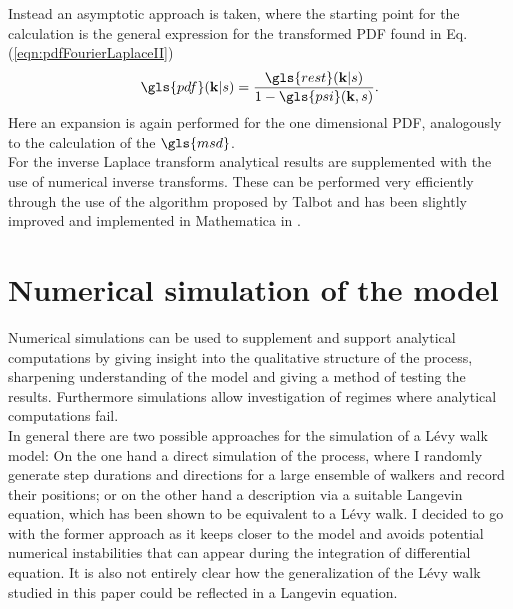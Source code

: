 Instead an asymptotic approach is taken, where the starting point for the calculation is the general expression for the transformed \gls{PDF} found in  Eq. (\ref{eqn:pdfFourierLaplaceII})
%
\begin{align}
\gls{pdf}(\ve{k}|s) = \frac{ \gls{rest}(\ve{k}|s)}{1 - \gls{psi}(\ve{k},s)}  .
\end{align}
%
Here an expansion is again performed for the one dimensional PDF, analogously to the calculation of the $\gls{msd}$. \\
For the inverse Laplace transform analytical results are supplemented with the use of numerical inverse transforms. These can be performed very efficiently through the use of the algorithm proposed by Talbot \cite{talbot1979} and has been slightly improved and implemented in Mathematica in \cite{abate2004}.


\section{Numerical simulation of the model}

Numerical simulations can be used to supplement and support analytical computations by giving insight into the qualitative structure of the process, sharpening understanding of the model and giving a method of testing the results. Furthermore simulations allow investigation of regimes where analytical computations fail.\\
{\color{blue}
In general there are two possible approaches for the simulation of a L\'evy walk model: On the one hand a direct simulation of the process, where I randomly generate step durations and directions for a large ensemble of walkers and record their positions; or on the other hand a description via a suitable Langevin equation, which has been shown to be equivalent to a L\'evy walk. 
I decided to go with the former approach as it keeps closer to the model and avoids potential numerical instabilities that can appear during the integration of differential equation. It is also not entirely clear how the generalization of the L\'evy walk studied in this paper could be reflected in a Langevin equation. 
}

